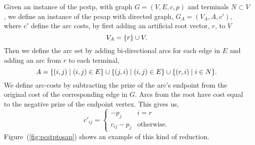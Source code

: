  Given an instance of the \gls{pcstp}, with graph $G = (V, E, c, p)$ and terminals $N \subset V$,
 we define an instance
 of the \gls{pcsap} with directed graph, $G_A = (V_A, A, c')$, where $c'$ define the arc costs,
 by first adding an
 artificial root vector, $r$, to $V$
 \[V_A = \{r\} \cup V\mathnormal{.}\]
 Then we define the arc set by adding bi-directional arcs for each edge in $E$ and
 adding an arc from $r$ to each terminal,
 \[A = \{(i,j) \mid (i,j) \in E \} \cup \{ (j,i) \mid (i,j) \in E \} \cup \{(r, i) \mid i \in N\}\mathnormal{.}\]
 We define arc-costs by subtracting the prize of the arc's endpoint from the original cost of the
 corresponding edge in $G$. Arcs from the root have cost equal to the negative prize of the endpoint vertex. This gives us,
 $$c'_{ij} =
 \begin{cases}
   -p_j & i = r \\
   c_{ij} - p_j & \text{otherwise.}
 \end{cases}
 $$
Figure~(\ref{fig:pcstptosap}) shows an example of this kind of reduction.

